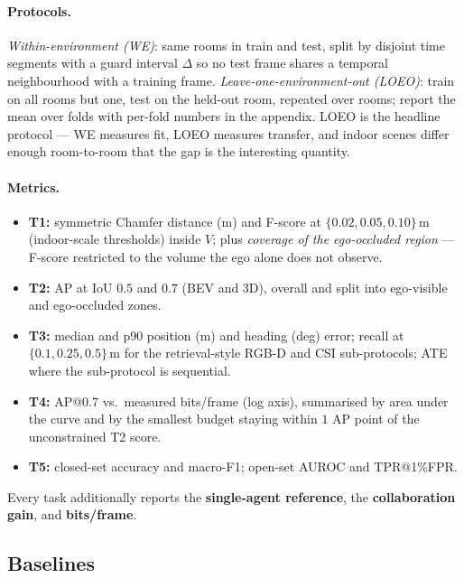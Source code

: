 \paragraph{Protocols.}
\emph{Within-environment (WE)}: same rooms in train and test, split by disjoint
time segments with a guard interval $\Delta$ so no test frame shares a temporal
neighbourhood with a training frame. \emph{Leave-one-environment-out (LOEO)}:
train on all rooms but one, test on the held-out room, repeated over rooms;
report the mean over folds with per-fold numbers in the appendix. LOEO is the
headline protocol --- WE measures fit, LOEO measures transfer, and indoor scenes
differ enough room-to-room that the gap is the interesting quantity.

\paragraph{Metrics.}
\begin{itemize}
  \item \textbf{T1:} symmetric Chamfer distance (m) and F-score at
        $\{0.02, 0.05, 0.10\}$\,m (indoor-scale thresholds) inside $V$; plus
        \emph{coverage of the ego-occluded region} --- F-score restricted to the
        volume the ego alone does not observe.
  \item \textbf{T2:} AP at IoU $0.5$ and $0.7$ (BEV and 3D), overall and split
        into ego-visible and ego-occluded zones.
  \item \textbf{T3:} median and p90 position (m) and heading (deg) error;
        recall at $\{0.1, 0.25, 0.5\}$\,m for the retrieval-style RGB-D and CSI
        sub-protocols; ATE where the sub-protocol is sequential.
  \item \textbf{T4:} AP@0.7 vs.\ measured bits/frame (log axis), summarised by
        area under the curve and by the smallest budget staying within $1$ AP
        point of the unconstrained T2 score.
  \item \textbf{T5:} closed-set accuracy and macro-F1; open-set AUROC and
        TPR@1\%FPR.
\end{itemize}
Every task additionally reports the \textbf{single-agent reference}, the
\textbf{collaboration gain}, and \textbf{bits/frame}.

\subsection{Baselines}
\label{sec:bench:baselines}

